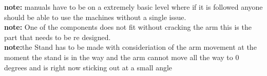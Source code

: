 \textbf{note:} manuals have to be on a extremely basic level where if it is followed anyone should be able to use the machines without a single issue.
\\
\textbf{note:} One of the components does not fit without cracking the arm this is the part that needs to be re designed.
\\
\textbf{note:}the Stand has to be made with consideriation of the arm movement at the moment the stand is in the way and the arm cannot move all the way to 0 degrees and is right now sticking out at a small angle

